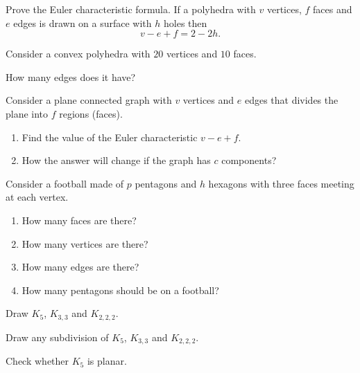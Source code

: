 \documentclass[12pt]{article}
\begin{document}
\begin{exercise}
    Prove the Euler characteristic formula. 
    If a polyhedra with $v$ vertices, $f$ faces and $e$ edges is drawn on a surface with $h$ holes then
    \[
    v -e + f = 2 - 2h.
    \]
\end{exercise}

\begin{exercise}
    Consider a convex polyhedra with $20$ vertices and $10$ faces. 
    
    How many edges does it have?
\end{exercise}

\begin{exercise}
    Consider a plane connected graph with $v$ vertices and $e$ edges that divides the plane into $f$ regions (faces).
    \begin{enumerate}[label=\alph*)]
        \item Find the value of the Euler characteristic $v - e + f$.
        \item How the answer will change if the graph has $c$ components?
    \end{enumerate}
\end{exercise}

\begin{exercise}
    Consider a football made of $p$ pentagons and $h$ hexagons with three faces meeting at each vertex.
    \begin{enumerate}[label=\alph*)]
        \item How many faces are there? %
        \item How many vertices are there? %
        \item How many edges are there? %
        \item How many pentagons should be on a football? %
    \end{enumerate}
\end{exercise}

\begin{exercise}
    Draw $K_5$, $K_{3,3}$ and $K_{2,2,2}$.

    Draw any subdivision of $K_5$, $K_{3,3}$ and $K_{2,2,2}$.
\end{exercise}


\begin{exercise}
    Check whether $K_5$ is planar.
\end{exercise}
\end{document}
